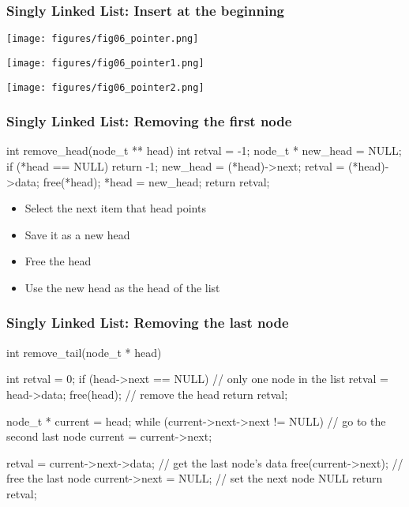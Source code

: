 \documentclass[newPxFont,sthlmFooter,nooffset]{beamer}
\begin{document}
\begin{frame}[t]
  \frametitle{Singly Linked List: Insert at the beginning}
    \texttt{[image: figures/fig06\_pointer.png]}  

\bigskip
    \texttt{[image: figures/fig06\_pointer1.png]}  

\bigskip
    \texttt{[image: figures/fig06\_pointer2.png]}  
\end{frame}


\begin{frame}[t, fragile]
  \frametitle{Singly Linked List: Removing the first node}

\begin{ncodedef}
int remove_head(node_t ** head) {
    int retval = -1;
    node_t * new_head = NULL;
    if (*head == NULL) {
        return -1;
    }
    new_head = (*head)->next;
    retval = (*head)->data;
    free(*head);
    *head = new_head;
    return retval;
}  
\end{ncodedef}
\begin{itemize}
\item Select the next item that head points
\item Save it as a new head
\item Free the head
\item Use the new head as the head of the list
\end{itemize}
\end{frame}


\begin{frame}[t, fragile]
  \frametitle{Singly Linked List: Removing the last node}
\begin{ncodedef}
int remove_tail(node_t * head) {
    int retval = 0;
    if (head->next == NULL) { // only one node in the list
        retval = head->data;
        free(head);           // remove the head
        return retval;
    }

    node_t * current = head;
    while (current->next->next != NULL) { // go to the second last node
        current = current->next;
    }

    retval = current->next->data; // get the last node's data
    free(current->next);         // free the last node
    current->next = NULL;        // set the next node NULL
    return retval;

}  
\end{ncodedef}
\end{frame}
\end{document}
